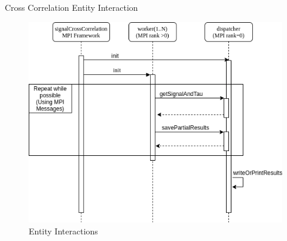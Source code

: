\documentclass{beamer}
\begin{document}




\begin{frame}{Cross Correlation Entity Interaction}
	\begin{figure}
		\includegraphics[width=0.7\linewidth]{crossCorrelationInteraction.png}
		\caption{Entity Interactions}
		\label{crossInteraction}
	\end{figure}
\end{frame}
\end{document}
